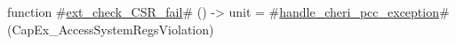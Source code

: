 function #\hyperref[sailRISCVzextzycheckzyCSRzyfail]{ext\_check\_CSR\_fail}# () -> unit =
  #\hyperref[sailRISCVzhandlezycherizypcczyexception]{handle\_cheri\_pcc\_exception}#(CapEx_AccessSystemRegsViolation)

